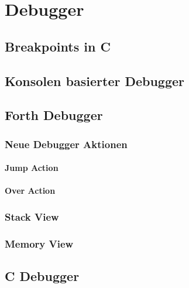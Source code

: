 \chapter{Debugger}

\section{Breakpoints in C}

\section{Konsolen basierter Debugger}

\section{Forth Debugger}

\subsection{Neue Debugger Aktionen}

\subsubsection{Jump Action}

\subsubsection{Over Action}

\subsection{Stack View}

\subsection{Memory View}

\section{C Debugger}